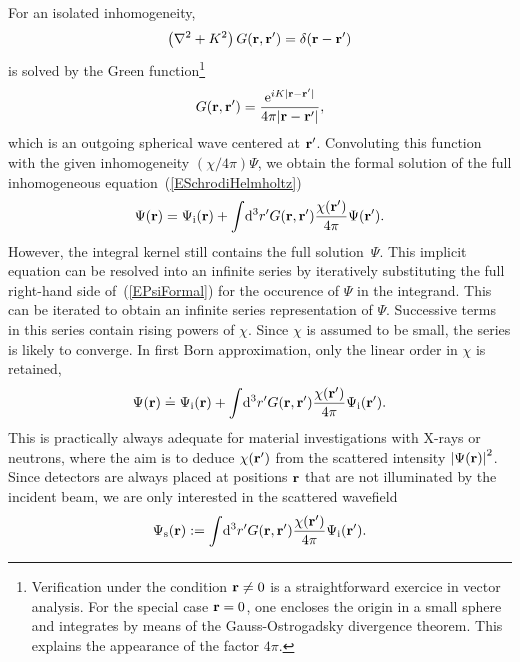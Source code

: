 For an isolated inhomogeneity,
\begin{equation}\label{EHelmholtzForGreen}
  \left(\mathbf{\nabla}^2+K^2\right)G(\mathbf{r},\mathbf{r}') = \delta(\mathbf{r}-\mathbf{r}')
\end{equation}
is solved by the Green function\footnote
{Verification under the condition $\mathbf{r}\ne0$
is a straightforward exercice in vector analysis.
For the special case $\mathbf{r}=0$,
one encloses the origin in a small sphere
and integrates by means of the Gauss-Ostrogadsky divergence theorem.
This explains the appearance of the factor $4\pi$.}
\begin{equation}\label{EGreens1}
  G(\mathbf{r},\mathbf{r}') = \frac{{\rm e}^{iK|\mathbf{r}-\mathbf{r}'|}}{4\pi |\mathbf{r}-\mathbf{r}'|},
\end{equation}
which is an outgoing spherical wave centered at $\mathbf{r}'$.
Convoluting this function with the given inhomogeneity $(\chi/4\pi)\Psi$,
we obtain the formal solution
of the full inhomogeneous equation~(\ref{ESchrodiHelmholtz})
\begin{equation}\label{EPsiFormal}
  \Psi(\mathbf{r})
  = \Psi_\text{i}(\mathbf{r})
  + \int\!{\rm d}^3r' G(\mathbf{r},\mathbf{r}')
                     \frac{\chi(\mathbf{r}')}{4\pi}\Psi(\mathbf{r}').
\end{equation}
However, the integral kernel still contains the full solution~$\Psi$.
This implicit equation
can be resolved into an infinite series
by iteratively substituting the full right-hand side of~(\ref{EPsiFormal})
for the occurence of $\Psi$ in the integrand.
This can be iterated to obtain an infinite series representation of $\Psi$.
Successive terms in this series contain rising powers of $\chi$.
Since $\chi$ is assumed to be small, the series is likely to converge.
In first Born approximation,
only the linear order in $\chi$ is retained,
\begin{equation}\label{EBorn}
  \Psi(\mathbf{r})
  \doteq \Psi_\text{i}(\mathbf{r})
  + \int\!{\rm d}^3r' G(\mathbf{r},\mathbf{r}')\frac{\chi(\mathbf{r}')}{4\pi}
   \Psi_\text{i}(\mathbf{r}').
\end{equation}
This is practically always adequate for
material investigations with X-rays or neutrons,
where the aim is to 
deduce $\chi(\mathbf{r}')$ from the scattered intensity ${|\Psi(\mathbf{r})|}^2$.
Since detectors are always placed at positions $\mathbf{r}$
that are not illuminated by the incident beam,
we are only interested in the scattered wavefield
\begin{equation}\label{EBornS}
  \Psi_\text{s}(\mathbf{r})
  :=
  \int\!{\rm d}^3r' G(\mathbf{r},\mathbf{r}')\frac{\chi(\mathbf{r}')}{4\pi}\Psi_\text{i}(\mathbf{r}').
\end{equation}

